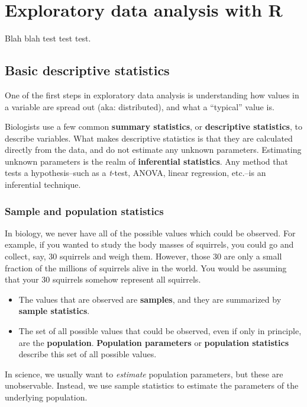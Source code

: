 \documentclass[
  13,
  letterpaper,
]{report}
\begin{document}
\part{Exploratory data analysis with R}

Blah blah test test test.

\chapter{Basic descriptive statistics}\label{sec-06}

One of the first steps in exploratory data analysis is understanding how
values in a variable are spread out (aka: distributed), and what a
``typical'' value is.

Biologists use a few common \textbf{summary statistics}, or
\textbf{descriptive statistics}, to describe variables. What makes
descriptive statistics is that they are calculated directly from the
data, and do not estimate any unknown parameters. Estimating unknown
parameters is the realm of \textbf{inferential statistics}. Any method
that tests a hypothesis--such as a \emph{t}-test, ANOVA, linear
regression, etc.--is an inferential technique.

\section{Sample and population statistics}\label{sec-06-sp}

In biology, we never have all of the possible values which could be
observed. For example, if you wanted to study the body masses of
squirrels, you could go and collect, say, 30 squirrels and weigh them.
However, those 30 are only a small fraction of the millions of squirrels
alive in the world. You would be assuming that your 30 squirrels somehow
represent all squirrels.

\begin{itemize}
\item
  The values that are observed are \textbf{samples}, and they are
  summarized by \textbf{sample statistics}.
\item
  The set of all possible values that could be observed, even if only in
  principle, are the \textbf{population}. \textbf{Population parameters}
  or \textbf{population statistics} describe this set of all possible
  values.
\end{itemize}

In science, we usually want to \emph{estimate} population parameters,
but these are unobservable. Instead, we use sample statistics to
estimate the parameters of the underlying population.
\end{document}
